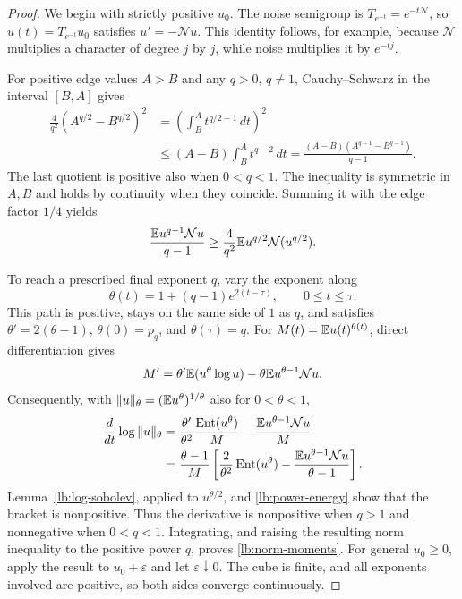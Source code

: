 \begin{proof}
We begin with strictly positive $u_0$. The noise semigroup is
$T_{e^{-t}}=e^{-t\mathcal N}$, so $u(t)=T_{e^{-t}}u_0$ satisfies
$u'=-\mathcal Nu$. This identity follows, for example, because
$\mathcal N$ multiplies a character of degree $j$ by $j$, while noise
multiplies it by $e^{-tj}$.

For positive edge values $A>B$ and any $q>0$, $q\ne1$,
Cauchy--Schwarz in the interval $[B,A]$ gives
\begin{align*}
 \frac4{q^2}(A^{q/2}-B^{q/2})^2
 &=\left(\int_B^A t^{q/2-1}\,dt\right)^2\\
 &\le(A-B)\int_B^A t^{q-2}\,dt
 =\frac{(A-B)(A^{q-1}-B^{q-1})}{q-1}.
\end{align*}
The last quotient is positive also when $0<q<1$.
The inequality is symmetric in $A,B$ and holds by continuity when they
coincide. Summing it with the edge factor $1/4$ yields
\begin{equation}\label{lb:power-energy}
 \frac{\mathbb E u^{q-1}\mathcal Nu}{q-1}
 \ge\frac4{q^2}\mathbb E u^{q/2}\mathcal N(u^{q/2}).
\end{equation}

To reach a prescribed final exponent $q$, vary the exponent along
\[
 \theta(t)=1+(q-1)e^{2(t-\tau)},\qquad 0\le t\le\tau.
\]
This path is positive, stays on the same side of $1$ as $q$, and satisfies
$\theta'=2(\theta-1)$, $\theta(0)=p_q$, and $\theta(\tau)=q$.
For $M(t)=\mathbb E u(t)^{\theta(t)}$, direct differentiation gives
\[
 M'=\theta'\mathbb E(u^\theta\log u)
       -\theta\mathbb E u^{\theta-1}\mathcal Nu.
\]
Consequently, with $\|u\|_\theta=(\mathbb E u^\theta)^{1/\theta}$ also for
$0<\theta<1$,
\begin{align}
 \frac{d}{dt}\log\|u\|_\theta
 &=\frac{\theta'}{\theta^2}
      \frac{\operatorname{Ent}(u^\theta)}{M}
      -\frac{\mathbb E u^{\theta-1}\mathcal Nu}{M}\notag\\
 &=\frac{\theta-1}{M}
   \left[
    \frac2{\theta^2}\operatorname{Ent}(u^\theta)
    -\frac{\mathbb E u^{\theta-1}\mathcal Nu}{\theta-1}
   \right].\label{lb:norm-derivative}
\end{align}
Lemma~\ref{lb:log-sobolev}, applied to $u^{\theta/2}$, and
\eqref{lb:power-energy} show that the bracket is nonpositive.
Thus the derivative is nonpositive when $q>1$ and nonnegative when
$0<q<1$. Integrating, and raising the resulting norm inequality to
the positive power $q$, proves \eqref{lb:norm-moments}.
For general $u_0\ge0$, apply the result to $u_0+\varepsilon$ and let
$\varepsilon\downarrow0$. The cube is finite, and all exponents involved
are positive, so both sides converge continuously.
\end{proof}

